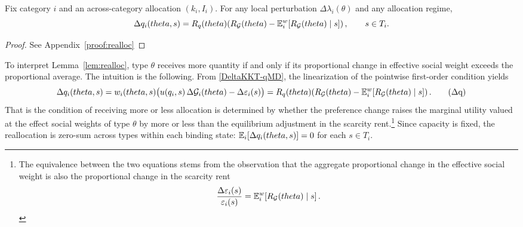 \documentclass{class}
\begin{document}
\begin{lemma}\label{lem:realloc}
Fix category \(i\) and an across-category allocation \((k_i,I_i)\). For any local perturbation $\Delta\lambda_i(\theta)$ and any allocation regime,
\[
\Delta q_i(theta,s) = R_q(theta)\!\left(R_{\mathcal{G}}(theta) - \mathbb{E}^w_i\!\left[R_{\mathcal{G}}(theta)\mid s\right]\right), \qquad s\in T_i.
\]
\end{lemma}
\begin{proof}
    See Appendix~\ref{proof:realloc}
\end{proof}

To interpret Lemma~\ref{lem:realloc}, type $\theta$ receives more quantity if and only if its proportional change in effective social weight exceeds the proportional average. The intuition is the following. From \ref{DeltaKKT-qMD}, the linearization of
the pointwise first-order condition yields
\[
\Delta q_i(theta,s)
=
w_i(theta,s)\bigl(u(q_i,s)\,\Delta\mathcal{G}_i(theta)-\Delta\varepsilon_i(s)\bigr)
=
R_q(theta)\!\left(R_{\mathcal{G}}(theta)-\mathbb{E}_i^w\!\left[R_{\mathcal{G}}(theta)\mid s\right]\right).
\label{Deltaq}\tag{$\Delta$q}\]
That is the condition of receiving more or less allocation is determined by whether the preference change raises the marginal utility valued at the effect social weights of type $\theta$ by more or less than the equilibrium adjustment in the scarcity rent.\footnote{ The equivalence between the two equations stems from the observation that the aggregate proportional change in the effective social weight is also the proportional change in the scarcity rent
\[
\frac{\Delta\varepsilon_i(s)}{\varepsilon_i(s)}
=
\mathbb{E}_i^w\!\left[R_{\mathcal{G}}(theta)\mid s\right].
\]
} Since capacity is fixed, the reallocation is zero-sum across types within each binding state: $\mathbb{E}_i\!\left[\Delta q_i(theta,s)\right]=0$ for each $s\in T_i$.
\end{document}
